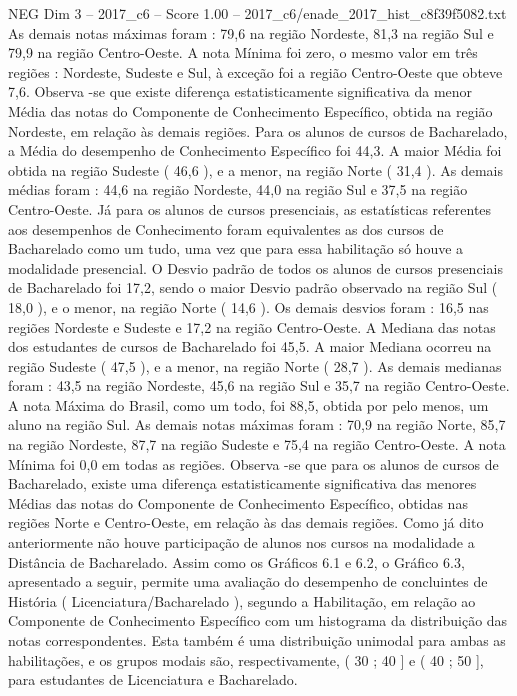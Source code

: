\begin{textsample}{NEG Dim 3 – 2017\_c6 – Score 1.00 – 2017\_c6/enade\_2017\_hist\_c8f39f5082.txt}
As demais notas máximas foram : 79,6 na região Nordeste, 81,3 na região Sul e 79,9 na região Centro-Oeste.
A nota Mínima foi zero, o mesmo valor em três regiões : Nordeste, Sudeste e Sul, à exceção foi a região Centro-Oeste que obteve 7,6.
Observa -se que existe diferença estatisticamente significativa da menor Média das notas do Componente de Conhecimento Específico, obtida na região Nordeste, em relação às demais regiões.
Para os alunos de cursos de Bacharelado, a Média do desempenho de Conhecimento Específico foi 44,3.
A maior Média foi obtida na região Sudeste ( 46,6 ), e a menor, na região Norte ( 31,4 ).
As demais médias foram : 44,6 na região Nordeste, 44,0 na região Sul e 37,5 na região Centro-Oeste.
Já para os alunos de cursos presenciais, as estatísticas referentes aos desempenhos de Conhecimento foram equivalentes as dos cursos de Bacharelado como um tudo, uma vez que para essa habilitação só houve a modalidade presencial.
O Desvio padrão de todos os alunos de cursos presenciais de Bacharelado foi 17,2, sendo o maior Desvio padrão observado na região Sul ( 18,0 ), e o menor, na região Norte ( 14,6 ).
Os demais desvios foram : 16,5 nas regiões Nordeste e Sudeste e 17,2 na região Centro-Oeste.
A Mediana das notas dos estudantes de cursos de Bacharelado foi 45,5.
A maior Mediana ocorreu na região Sudeste ( 47,5 ), e a menor, na região Norte ( 28,7 ).
As demais medianas foram : 43,5 na região Nordeste, 45,6 na região Sul e 35,7 na região Centro-Oeste.
A nota Máxima do Brasil, como um todo, foi 88,5, obtida por pelo menos, um aluno na região Sul.
As demais notas máximas foram : 70,9 na região Norte, 85,7 na região Nordeste, 87,7 na região Sudeste e 75,4 na região Centro-Oeste.
A nota Mínima foi 0,0 em todas as regiões.
Observa -se que para os alunos de cursos de Bacharelado, existe uma diferença estatisticamente significativa das menores Médias das notas do Componente de Conhecimento Específico, obtidas nas regiões Norte e Centro-Oeste, em relação às das demais regiões.
Como já dito anteriormente não houve participação de alunos nos cursos na modalidade a Distância de Bacharelado.
Assim como os Gráficos 6.1 e 6.2, o Gráfico 6.3, apresentado a seguir, permite uma avaliação do desempenho de concluintes de História ( Licenciatura/Bacharelado ), segundo a Habilitação, em relação ao Componente de Conhecimento Específico com um histograma da distribuição das notas correspondentes.
Esta também é uma distribuição unimodal para ambas as habilitações, e os grupos modais são, respectivamente, ( 30 ; 40 ] e ( 40 ; 50 ], para estudantes de Licenciatura e Bacharelado.

\end{textsample}

